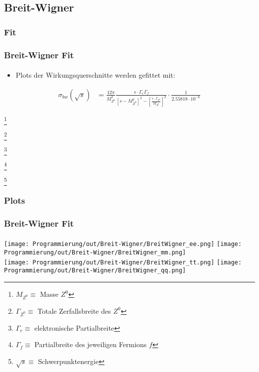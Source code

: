 \documentclass{beamer}
\newcommand\blfootnote[1]{%
  \begingroup
  \renewcommand\thefootnote{}\footnote{#1}%
  \addtocounter{footnote}{-1}%
  \endgroup
}
\begin{document}
\subsection{Breit-Wigner}

\subsubsection{Fit}
\begin{frame}
	\frametitle{Breit-Wigner Fit}
	\framesubtitle{}
	\begin{itemize}
		\item Plots der Wirkungsquerschnitte werden gefittet mit:
	\end{itemize}
	\begin{align*}
		\sigma_{bw}(\sqrt{s}) &= \frac{12\pi}{M_{Z^0}^2}
		\frac{
		s\cdot \Gamma_e \Gamma_f
		}
		{
		\left[s-M_{Z^0}^2\right]^2 - \left[\frac{s\cdot \Gamma_{Z^0}}{M_{Z^0}}\right]^2
		}
		\cdot
		\frac{1}{2.55818\cdot 10^{-6}}
	\end{align*}
	
	\blfootnote{$M_{Z^0} \equiv$ Masse $Z^0$}
	\blfootnote{$\Gamma_{Z^0} \equiv$ Totale Zerfallsbreite des  $Z^0$}
	\blfootnote{$\Gamma_e \equiv$ elektronische Partialbreite}
	\blfootnote{$\Gamma_f \equiv$ Partialbreite des jeweiligen Fermions $f$}
	\blfootnote{$\sqrt{s} \equiv$ Schwerpunktenergie}
\end{frame}

\subsubsection{Plots}
\begin{frame}
	\frametitle{Breit-Wigner Fit}
	\framesubtitle{}
	\texttt{[image: Programmierung/out/Breit-Wigner/BreitWigner\_ee.png]}
	\texttt{[image: Programmierung/out/Breit-Wigner/BreitWigner\_mm.png]}\\
	\texttt{[image: Programmierung/out/Breit-Wigner/BreitWigner\_tt.png]}
	\texttt{[image: Programmierung/out/Breit-Wigner/BreitWigner\_qq.png]}\\
\end{frame}
\end{document}
